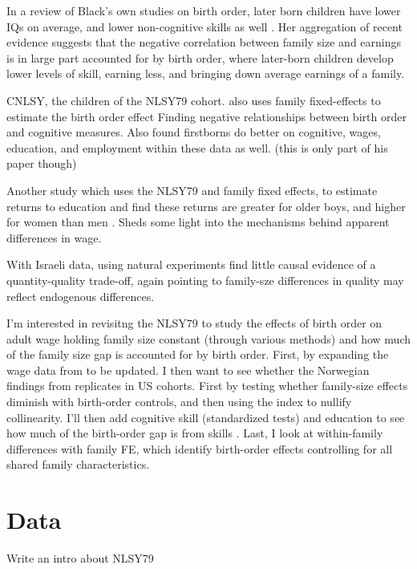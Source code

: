\documentclass[12pt]{article}
\begin{document}
In a review of Black's own studies on birth order, later born children have lower IQs on average, and lower non-cognitive skills as well \citep{black17}. Her aggregation of recent evidence suggests that the negative correlation between family size and earnings is in large part accounted for by birth order, where later-born children develop lower levels of skill, earning less, and bringing down average earnings of a family.

CNLSY, the children of the NLSY79 cohort. \citet{pav} also uses family fixed-effects to estimate the birth order effect Finding negative relationships between birth order and cognitive measures. Also found firstborns do better on cognitive, wages, education, and employment within these data as well. (this is only part of his paper though)

Another study which uses the NLSY79 and family fixed effects, to estimate returns to education and find these returns are greater for older boys, and higher for women than men \citep{bronars}. Sheds some light into the mechanisms behind apparent differences in wage.

With Israeli data, \citet{angrist} using natural experiments find little causal evidence of a quantity-quality trade-off, again pointing to family-sze differences in quality may reflect endogenous differences. 

I'm interested in revisitng the NLSY79 to study the effects of birth order on adult wage holding family size constant (through various methods) and how much of the family size gap is accounted for by birth order. First, by expanding the wage data from \citet{kess} to be updated. I then want to see whether the Norwegian findings from \citet{black} replicates in US cohorts. First by testing whether family-size effects diminish with birth-order controls, and then using the \citet{booth} index to nullify collinearity. I'll then add cognitive skill (standardized tests) and education to see how much of the birth-order gap is from skills \citep{black17, pav}. Last, I look at within-family differences with family FE, which identify birth-order effects controlling for all shared family characteristics. 

\section{Data}\label{sec:data}

Write an intro about NLSY79
\end{document}
